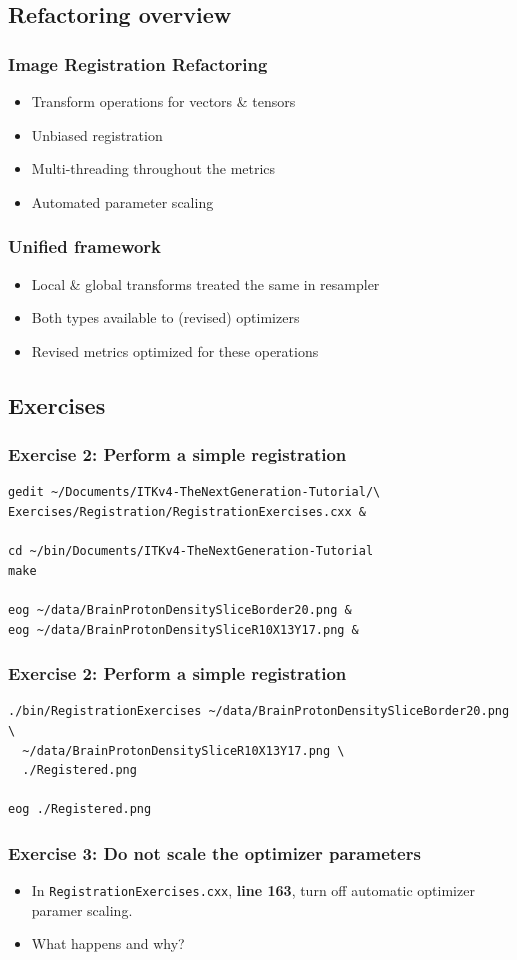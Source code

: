 \subsection{Refactoring overview}

\begin{frame}
\frametitle{Image Registration Refactoring}
\Large
\begin{itemize}
\item Transform operations for vectors \&  tensors
\pause
\item Unbiased registration
\pause
\item Multi-threading throughout the metrics
\pause 
\item Automated parameter scaling
\end{itemize}
\end{frame}

\begin{frame}
\frametitle{Unified framework}
\Large
\begin{itemize}
\item Local \& global transforms treated the same in resampler
\pause 
\item Both types available to (revised) optimizers
\pause 
\item Revised metrics optimized for these operations
\end{itemize}
\end{frame}

\subsection{Exercises}

\begin{frame}[fragile]
\frametitle{Exercise 2: Perform a simple registration}
\begin{verbatim}
gedit ~/Documents/ITKv4-TheNextGeneration-Tutorial/\
Exercises/Registration/RegistrationExercises.cxx &

cd ~/bin/Documents/ITKv4-TheNextGeneration-Tutorial
make

eog ~/data/BrainProtonDensitySliceBorder20.png &
eog ~/data/BrainProtonDensitySliceR10X13Y17.png &
\end{verbatim}
\end{frame}

\begin{frame}[fragile]
\frametitle{Exercise 2: Perform a simple registration}
\begin{verbatim}
./bin/RegistrationExercises ~/data/BrainProtonDensitySliceBorder20.png \
  ~/data/BrainProtonDensitySliceR10X13Y17.png \
  ./Registered.png

eog ./Registered.png
\end{verbatim}
\end{frame}

\begin{frame}[fragile]
\frametitle{Exercise 3: Do not scale the optimizer parameters}
  \begin{itemize}
    \item In \texttt{RegistrationExercises.cxx}, \textbf{line 163}, turn off
      automatic optimizer paramer scaling.
    \item What happens and why?
  \end{itemize}
\end{frame}
